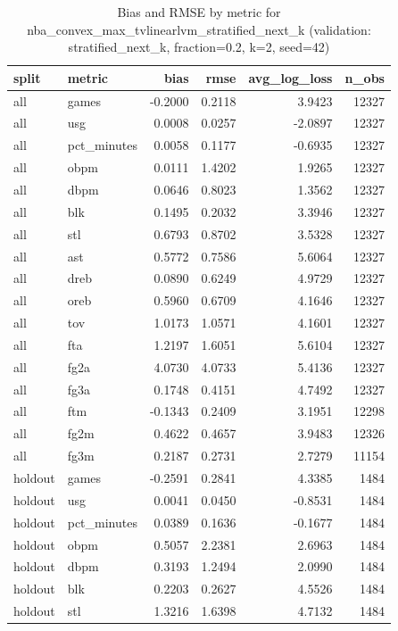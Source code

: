 \begin{table}
\caption{Bias and RMSE by metric for nba_convex_max_tvlinearlvm_stratified_next_k (validation: stratified_next_k, fraction=0.2, k=2, seed=42)}
\label{tab:nba_convex_max_tvlinearlvm_stratified_next_k_vs_stratified_next_k_f20_k2_s42_bias_rmse}
\begin{tabular}{llrrrr}
\toprule
split & metric & bias & rmse & avg\_log\_loss & n\_obs \\
\midrule
all & games & -0.2000 & 0.2118 & 3.9423 & 12327 \\
all & usg & 0.0008 & 0.0257 & -2.0897 & 12327 \\
all & pct\_minutes & 0.0058 & 0.1177 & -0.6935 & 12327 \\
all & obpm & 0.0111 & 1.4202 & 1.9265 & 12327 \\
all & dbpm & 0.0646 & 0.8023 & 1.3562 & 12327 \\
all & blk & 0.1495 & 0.2032 & 3.3946 & 12327 \\
all & stl & 0.6793 & 0.8702 & 3.5328 & 12327 \\
all & ast & 0.5772 & 0.7586 & 5.6064 & 12327 \\
all & dreb & 0.0890 & 0.6249 & 4.9729 & 12327 \\
all & oreb & 0.5960 & 0.6709 & 4.1646 & 12327 \\
all & tov & 1.0173 & 1.0571 & 4.1601 & 12327 \\
all & fta & 1.2197 & 1.6051 & 5.6104 & 12327 \\
all & fg2a & 4.0730 & 4.0733 & 5.4136 & 12327 \\
all & fg3a & 0.1748 & 0.4151 & 4.7492 & 12327 \\
all & ftm & -0.1343 & 0.2409 & 3.1951 & 12298 \\
all & fg2m & 0.4622 & 0.4657 & 3.9483 & 12326 \\
all & fg3m & 0.2187 & 0.2731 & 2.7279 & 11154 \\
holdout & games & -0.2591 & 0.2841 & 4.3385 & 1484 \\
holdout & usg & 0.0041 & 0.0450 & -0.8531 & 1484 \\
holdout & pct\_minutes & 0.0389 & 0.1636 & -0.1677 & 1484 \\
holdout & obpm & 0.5057 & 2.2381 & 2.6963 & 1484 \\
holdout & dbpm & 0.3193 & 1.2494 & 2.0990 & 1484 \\
holdout & blk & 0.2203 & 0.2627 & 4.5526 & 1484 \\
holdout & stl & 1.3216 & 1.6398 & 4.7132 & 1484 \\

\end{tabular}
\end{table}
